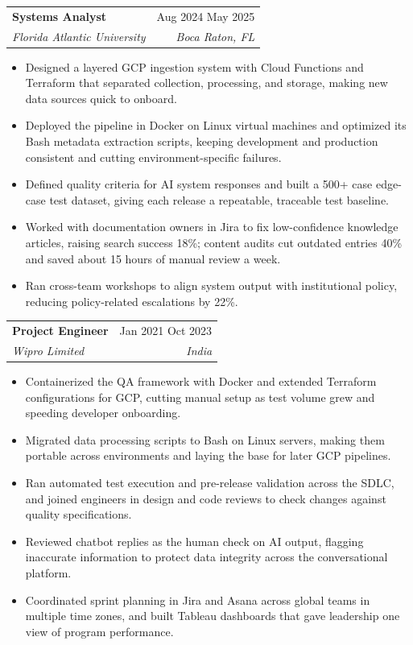 \documentclass[letterpaper,10pt]{article}
\makeatletter
\newenvironment{bullets}
  {\begin{itemize}[leftmargin=1.15em,labelsep=0.45em,itemsep=1.3pt,
                   topsep=2.5pt,parsep=0pt,partopsep=0pt,label=\textbullet]}
  {\end{itemize}\vspace{1pt}}
\newcommand{\entry}[4]{%
  \begin{tabularx}{\linewidth}{@{}X r@{}}
    \textbf{#1} & #2 \\
    \textit{#3} & \textit{#4} \\
  \end{tabularx}%
  \vspace{-3pt}
}
\makeatother
\begin{document}
\entry{Systems Analyst}{Aug 2024 \textendash{} May 2025}
      {Florida Atlantic University}{Boca Raton, FL}
\begin{bullets}
  \item Designed a layered GCP ingestion system with Cloud Functions and Terraform
        that separated collection, processing, and storage, making new data
        sources quick to onboard.
  \item Deployed the pipeline in Docker on Linux virtual machines and optimized its
        Bash metadata extraction scripts, keeping development and production
        consistent and cutting environment-specific failures.
  \item Defined quality criteria for AI system responses and built a 500+ case
        edge-case test dataset, giving each release a repeatable, traceable test
        baseline.
  \item Worked with documentation owners in Jira to fix low-confidence knowledge
        articles, raising search success 18\%; content audits cut outdated entries
        40\% and saved about 15 hours of manual review a week.
  \item Ran cross-team workshops to align system output with institutional policy,
        reducing policy-related escalations by 22\%.
\end{bullets}

\entry{Project Engineer}{Jan 2021 \textendash{} Oct 2023}
      {Wipro Limited}{India}  %
\begin{bullets}
  \item Containerized the QA framework with Docker and extended Terraform
        configurations for GCP, cutting manual setup as test volume grew and
        speeding developer onboarding.
  \item Migrated data processing scripts to Bash on Linux servers, making them
        portable across environments and laying the base for later GCP pipelines.
  \item Ran automated test execution and pre-release validation across the SDLC,
        and joined engineers in design and code reviews to check changes against
        quality specifications.
  \item Reviewed chatbot replies as the human check on AI output, flagging
        inaccurate information to protect data integrity across the conversational
        platform.
  \item Coordinated sprint planning in Jira and Asana across global teams in
        multiple time zones, and built Tableau dashboards that gave leadership one
        view of program performance.
\end{bullets}
\end{document}
